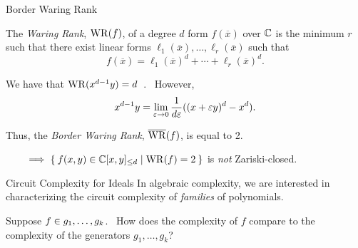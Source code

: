 \documentclass[aspectratio=169]{beamer}
\begin{document}
\begin{frame}{Border Waring Rank}
  \begin{defn}
    The \emph{Waring Rank}, $\operatorname{WR}(f)$, of a degree $d$ form $f(\overline{x})$ over $\mathbb{C}$ is the minimum $r$ such that there exist linear forms $\ell_1(\overline{x}), \ldots, \ell_r(\overline{x})$ such that
    \[
      f(\overline{x}) = \ell_1(\overline{x})^d + \cdots + \ell_r(\overline{x})^d.
    \]
  \end{defn}

  \pause

  \begin{ex}[{\cite{DL25}}]
    We have that $\operatorname{WR}(x^{d - 1} y) = d$~\cite{Old40}.\ \pause
    However,
    \[
      x^{d - 1}y = \lim_{ \varepsilon \to 0 } \frac{1}{d \varepsilon} ((x + \varepsilon y)^d - x^d).
    \]

    \pause

    Thus, the \emph{Border Waring Rank}, $\overline{\operatorname{WR}}(f)$, is equal to 2.

    \pause

    $\qquad \implies \Set{f(x, y) \in \mathbb{C}[x, y]_{\leq d} \mid \operatorname{WR}(f) = 2}$ is \textcolor{sigma@alertred}{\textit{not}} Zariski-closed.
  \end{ex}
\end{frame}

\begin{frame}{Circuit Complexity for Ideals}
    In algebraic complexity, we are interested in characterizing the circuit complexity of \emph{families} of polynomials.

    \pause
    \vspace{20pt}

    \begin{question}
        Suppose $f \in \ideal{g_1, \ldots, g_k}$.\ \pause
        How does the complexity of $f$ compare to the complexity of the generators $g_1, \ldots, g_k$?
    \end{question}
\end{frame}
\end{document}
